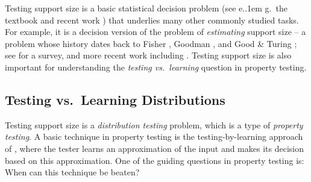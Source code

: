 \documentclass{theoretics}
\newcommand*\eg{e.\kern.1em g.\ }
\begin{document}
Testing support size is a basic statistical decision problem (see \eg the textbook \cite[\S 11.4]{Gol17} and
recent work \cite{GR23,AF24,AFL24,KLR25}) that underlies many other commonly studied tasks.  For example,
it is a decision version of the problem of \emph{estimating} support size -- a problem whose history
dates back to Fisher \cite{FCW43}, Goodman \cite{Goodman49}, and Good \& Turing \cite{Good53}; see
\cite{BF93} for a survey, and more recent work including \cite{RRSS09,VV11stoc,VV17,WY19,HO19}.
Testing support size is also
important for understanding the \emph{testing vs.~learning} question in property testing.

\subsection{Testing \texorpdfstring{vs.~Learning Distributions}{vs. Learning Distributions}}

Testing support size is a \emph{distribution testing} problem, which
is a type of \emph{property testing}.  A basic technique in property testing is
the testing-by-learning approach of \cite{GGR98}, where the tester learns an approximation of
the input and makes its decision based on this approximation. One of the guiding questions in
property testing is: When can this technique be beaten?
\end{document}
